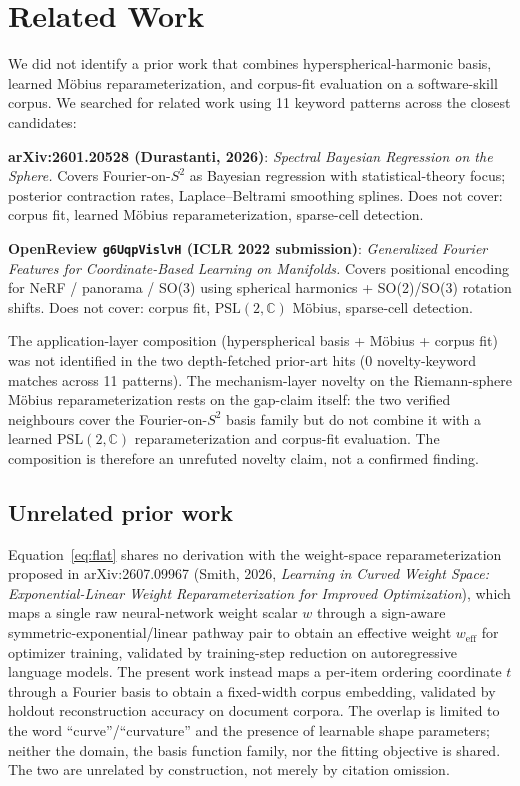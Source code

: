 \documentclass[11pt,a4paper]{article}
\begin{document}
\section{Related Work}

We did not identify a prior work that combines hyperspherical-harmonic basis, learned Möbius reparameterization, and corpus-fit evaluation on a software-skill corpus. We searched for related work using 11 keyword patterns across the closest candidates:

\textbf{arXiv:2601.20528 (Durastanti, 2026)}: \emph{Spectral Bayesian Regression on the Sphere.} Covers Fourier-on-$S^2$ as Bayesian regression with statistical-theory focus; posterior contraction rates, Laplace--Beltrami smoothing splines. Does not cover: corpus fit, learned Möbius reparameterization, sparse-cell detection.

\textbf{OpenReview \texttt{g6UqpVislvH} (ICLR 2022 submission)}: \emph{Generalized Fourier Features for Coordinate-Based Learning on Manifolds.} Covers positional encoding for NeRF / panorama / SO(3) using spherical harmonics + SO(2)/SO(3) rotation shifts. Does not cover: corpus fit, $\mathrm{PSL}(2,\mathbb{C})$ Möbius, sparse-cell detection.

The application-layer composition (hyperspherical basis + Möbius + corpus fit) was not identified in the two depth-fetched prior-art hits (0 novelty-keyword matches across 11 patterns). The mechanism-layer novelty on the Riemann-sphere Möbius reparameterization rests on the gap-claim itself: the two verified neighbours cover the Fourier-on-$S^2$ basis family but do not combine it with a learned $\mathrm{PSL}(2,\mathbb{C})$ reparameterization and corpus-fit evaluation. The composition is therefore an unrefuted novelty claim, not a confirmed finding.

\subsection{Unrelated prior work}

Equation~\ref{eq:flat} shares no derivation with the weight-space reparameterization proposed in arXiv:2607.09967 (Smith, 2026, \emph{Learning in Curved Weight Space: Exponential-Linear Weight Reparameterization for Improved Optimization}), which maps a single raw neural-network weight scalar $w$ through a sign-aware symmetric-exponential/linear pathway pair to obtain an effective weight $w_{\mathrm{eff}}$ for optimizer training, validated by training-step reduction on autoregressive language models. The present work instead maps a per-item ordering coordinate $t$ through a Fourier basis to obtain a fixed-width corpus embedding, validated by holdout reconstruction accuracy on document corpora. The overlap is limited to the word ``curve''/``curvature'' and the presence of learnable shape parameters; neither the domain, the basis function family, nor the fitting objective is shared. The two are unrelated by construction, not merely by citation omission.
\end{document}
